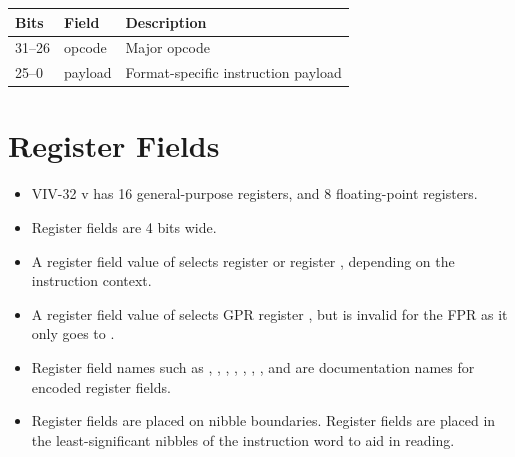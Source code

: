 \begin{center}
\begin{tabular}{lll}
\hline
Bits & Field & Description \\
\hline
31--26 & opcode & Major opcode \\
25--0  & payload & Format-specific instruction payload \\
\hline
\end{tabular}
\end{center}

\section{Register Fields}

\begin{itemize}
  \item VIV-32 v\version{} has 16 general-purpose registers, and 8
        floating-point registers.
  \item Register fields are 4 bits wide.
  \item A register field value of  selects register  or
        register , depending on the instruction context.
  \item A register field value of  selects GPR register ,
        but is invalid for the FPR as it only goes to .
  \item Register field names such as , , ,
        , , , , and  are
        documentation names for encoded register fields.
  \item Register fields are placed on nibble boundaries. Register fields are
        placed in the least-significant nibbles of the instruction word to aid
        in reading.
\end{itemize}

